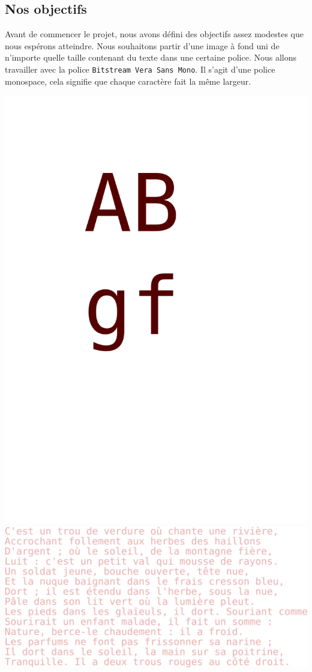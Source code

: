 \documentclass[a4paper,12pt,titlepage]{report}
\begin{document}
		\subsection{Nos objectifs}
		Avant de commencer le projet, nous avons défini des objectifs assez modestes que nous espérons atteindre. Nous souhaitons partir d'une image à fond uni de n'importe quelle taille contenant du texte dans une certaine police. Nous allons travailler avec la police \texttt{Bitstream Vera Sans Mono}. Il s'agit d'une police monospace, cela signifie que chaque caractère fait la même largeur.\\
		\begin{center}
			\includegraphics[scale=0.1]{../../Data/fullpage.png}
			\includegraphics[scale=0.1]{../../Data/poesie.png}

\end{center}
\end{document}
